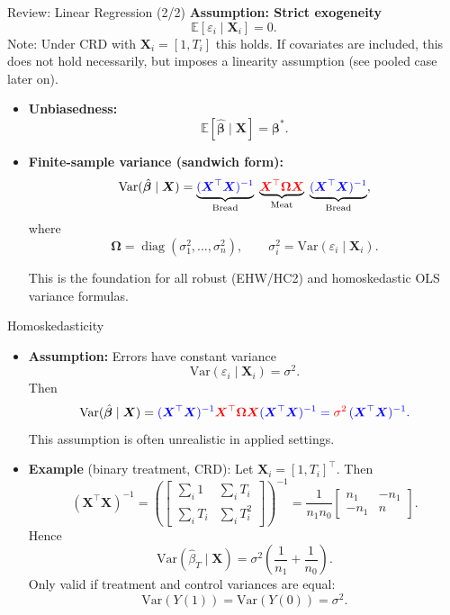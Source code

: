 \documentclass[10pt, handout]{beamer}
\theoremstyle{plain}
\newcommand{\bX}{\bm{X}}
\newcommand{\E}{\mathbb{E}}
\DeclareMathOperator{\diag}{diag}
\newcommand{\Var}{\mathrm{Var}}
\begin{document}
\begin{frame}{Review: Linear Regression (2/2)}
\small
\textbf{Assumption: Strict exogeneity}
\[
\E[\varepsilon_i \mid \bX_i] = 0.
\]
Note: Under CRD with $\bX_i = [1, T_i]$ this holds. If covariates are included, this does not hold necessarily, but imposes a linearity assumption (see pooled case later on).
\pause
\vspace{0.8em}

\begin{itemize}
  \item \textbf{Unbiasedness:}
  \[
    \E[\hat{\bm{\beta}} \mid \bX] = \bm{\beta}^\ast.
  \]
  \pause
  \vspace{0.8em}

  \item \textbf{Finite-sample variance (sandwich form):}
  \[
    \Var(\hat{\bm{\beta}} \mid \bX)
    = \underbrace{\color{blue}{(\bX^\top \bX)^{-1}}}_{\text{Bread}}
      \;\underbrace{\color{red}{\bX^\top \bm{\Omega} \bX}}_{\text{Meat}}\;
      \underbrace{\color{blue}{(\bX^\top \bX)^{-1}}}_{\text{Bread}},
  \]
  where
  \[
    \bm{\Omega} = \diag(\sigma_1^2, \ldots, \sigma_n^2),
    \qquad \sigma_i^2 = \Var(\varepsilon_i \mid \bX_i).
  \]
  
  \pause
  \vspace{0.5em}
  This is the foundation for all robust (EHW/HC2) and homoskedastic OLS variance formulas.
\end{itemize}
\end{frame}

\begin{frame}{Homoskedasticity}
\small
\begin{itemize}
  \item \textbf{Assumption:} Errors have constant variance  
  \[
  \Var(\varepsilon_i \mid \bX_i) = \sigma^2.
  \]
  \pause
  Then
  \[
  \Var(\hat{\bm{\beta}} \mid \bX)
  = \color{blue}{(\bX^\top \bX)^{-1}}
    \color{red}{\bX^\top \bm{\Omega} \bX}
    \color{blue}{(\bX^\top \bX)^{-1}}
  = \color{red}{\sigma^2}\,\color{blue}{(\bX^\top \bX)^{-1}}.
  \]
  \pause
  \vspace{0.4em}
  This assumption is often unrealistic in applied settings.
  \pause
  \vspace{1em}

  \item \textbf{Example} (binary treatment, CRD): Let $\bX_i = [1, T_i]^\top$.  
  Then
  \[
  (\bX^\top \bX)^{-1}
  = 
  \left(
  \begin{bmatrix}
  \sum_i 1 & \sum_i T_i \\[3pt]
  \sum_i T_i & \sum_i T_i^2
  \end{bmatrix}
  \right)^{-1}
  = \frac{1}{n_1 n_0}
  \begin{bmatrix}
  n_1 & -n_1 \\[3pt]
  -n_1 & n
  \end{bmatrix}.
  \]
  \pause
  Hence
  \[
  \Var(\hat{\beta}_T \mid \bX)
  = \sigma^2\!\left(\frac{1}{n_1} + \frac{1}{n_0}\right).
  \]
  \pause
  \vspace{0.3em}
  Only valid if treatment and control variances are equal:
  \[
  \Var(Y(1)) = \Var(Y(0)) = \sigma^2.
  \]
\end{itemize}
\end{frame}
\end{document}
